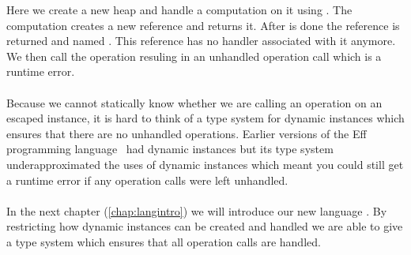 Here we create a new heap and handle a computation on it using .
The computation creates a new reference and returns it.
After  is done the reference is returned and named .
This reference has no handler associated with it anymore.
We then call the  operation resuling in an unhandled operation call which is a runtime error.
\\\\
Because we cannot statically know whether we are calling an operation on an escaped instance, it is hard to think of a type system for dynamic instances which ensures that there are no unhandled operations. Earlier versions of the Eff programming language~\autocite{eff1} had dynamic instances but its type system underapproximated the uses of dynamic instances which meant you could still get a runtime error if any operation calls were left unhandled.
\\\\
In the next chapter (\cref{chap:langintro}) we will introduce our new language \lang{}. By restricting how dynamic instances can be created and handled we are able to give a type system which ensures that all operation calls are handled.
